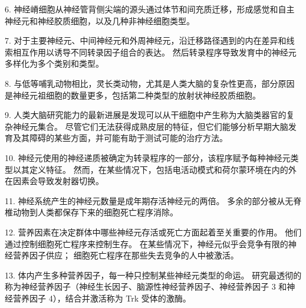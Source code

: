 6. 神经嵴细胞从神经管背侧尖端的源头通过体节和间充质迁移，形成感觉和自主神经元和神经胶质细胞，以及几种非神经细胞类型。 

7. 对于主要神经元、中间神经元和外周神经元，沿迁移路径遇到的内在差异和线索相互作用以诱导不同转录因子组合的表达。 然后转录程序导致发育中的神经元多样化为多个类别和类型。 

8. 与低等哺乳动物相比，灵长类动物，尤其是人类大脑的复杂性更高，部分原因是神经元祖细胞的数量更多，包括第二种类型的放射状神经胶质细胞。 

9. 人类大脑研究能力的最新进展是发现可以从干细胞中产生称为大脑类器官的复杂神经元集合。 尽管它们无法获得成熟皮层的特征，但它们能够分析早期大脑发育及其障碍的某些方面，并可能有助于测试可能的治疗方法。 

10. 神经元使用的神经递质被确定为转录程序的一部分，该程序赋予每种神经元类型以其定义特征。 然而，在某些情况下，包括电活动模式和荷尔蒙环境在内的外在因素会导致发射器切换。 

11. 神经系统产生的神经元数量是成年期存活神经元的两倍。 多余的部分被从无脊椎动物到人类都保存下来的细胞死亡程序消除。

12. 营养因素在决定群体中哪些神经元存活或死亡方面起着至关重要的作用。 他们通过控制细胞死亡程序来控制生存。 在某些情况下，神经元似乎会竞争有限的神经营养因子供应； 细胞死亡程序在那些失去竞争的人中被激活。 

13. 体内产生多种营养因子，每一种只控制某些神经元类型的命运。 研究最透彻的称为神经营养因子（神经生长因子、脑源性神经营养因子、神经营养因子 3 和神经营养因子 4），结合并激活称为 Trk 受体的激酶。

